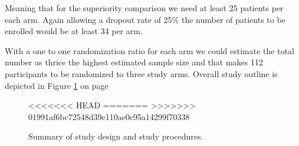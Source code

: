 \documentclass{article}\usepackage[]{graphicx}\usepackage[]{color}
\begin{document}
Meaning that for the superiority comparison we need at least 25 patients per each arm. Again allowing a dropout rate of 25\% the number of patients to be enrolled would be at least 34 per arm.

With a one to one randomization ratio for each arm we could estimate the total number as thrice the highest estimated sample size and that makes 112 participants to be randomized to three study arms. Overall study outline is depicted in Figure \ref{fig:studyoutline} on page \pageref{fig:studyoutline}

\begin{figure}
  \centering
<<<<<<< HEAD
  \noindent{}
=======
>>>>>>> 01991af6bc72548d39e110ae0c95a14299f70338
  \caption {Summary of study design and study procedures.}
  \label{fig:studyoutline}
\end{figure}
\end{document}

